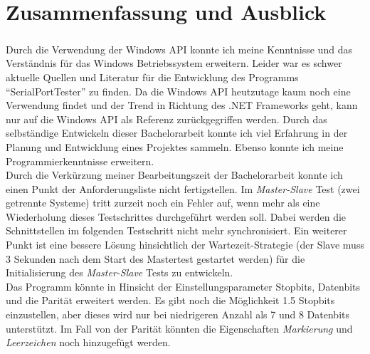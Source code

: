 \chapter{Zusammenfassung und Ausblick}\label{chp:zusammenfassung}


\paragraph{}


Durch die Verwendung der Windows API konnte ich meine Kenntnisse und das Verständnis für das Windows Betriebssystem erweitern. Leider war es schwer aktuelle Quellen und Literatur für die Entwicklung des Programms "`SerialPortTester"' zu finden. Da die Windows API heutzutage kaum noch eine Verwendung findet und der Trend in Richtung des .NET Frameworks geht, kann nur auf die Windows API als Referenz zurückgegriffen werden. Durch das selbständige Entwickeln dieser Bachelorarbeit konnte ich viel Erfahrung in der Planung und Entwicklung eines Projektes sammeln. Ebenso konnte ich meine Programmierkenntnisse erweitern. \\
 

Durch die Verkürzung meiner Bearbeitungszeit der Bachelorarbeit konnte ich einen Punkt der Anforderungsliste nicht fertigstellen. Im \textit{Master-Slave} Test (zwei getrennte Systeme) tritt zurzeit noch ein Fehler auf, wenn mehr als eine Wiederholung dieses Testschrittes durchgeführt werden soll. Dabei werden die Schnittstellen im folgenden Testschritt nicht mehr synchronisiert. Ein weiterer Punkt ist eine bessere Lösung hinsichtlich der Wartezeit-Strategie (der Slave muss 3 Sekunden nach dem Start des Mastertest gestartet werden) für die Initialisierung des \textit{Master-Slave} Tests zu entwickeln.\\

Das Programm könnte in Hinsicht der Einstellungsparameter Stopbits, Datenbits und die Parität erweitert werden. Es gibt noch die Möglichkeit 1.5 Stopbits einzustellen, aber dieses wird nur bei niedrigeren Anzahl als 7 und 8 Datenbits unterstützt. Im Fall von der Parität könnten die Eigenschaften \textit{Markierung} und \textit{Leerzeichen} noch hinzugefügt werden.
